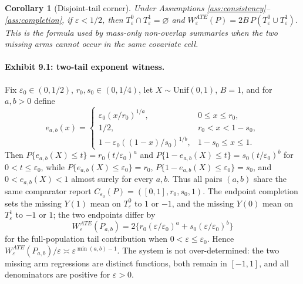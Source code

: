 \documentclass[11pt]{article}
\theoremstyle{definition}
\theoremstyle{plain}
\newtheorem{corollary}{Corollary}
\theoremstyle{remark}
\begin{document}
\begin{corollary}[Disjoint-tail corner]\label{cor:disjoint-tail}
Under Assumptions \ref{ass:consistency}--\ref{ass:completion}, if
\(\varepsilon<1/2\), then \(T_\varepsilon^0\cap T_\varepsilon^1=\varnothing\) and
\(W_\varepsilon^{ATE}(P)=2B\,P(T_\varepsilon^0\cup T_\varepsilon^1)\). This is the
formula used by mass-only non-overlap summaries when the two missing arms cannot occur
in the same covariate cell.
\end{corollary}

\paragraph{Exhibit 9.1: two-tail exponent witness.}
Fix \(\varepsilon_0\in(0,1/2)\), \(r_0,s_0\in(0,1/4)\), let
\(X\sim \mathrm{Unif}(0,1)\), \(B=1\), and for \(a,b>0\) define
\[
e_{a,b}(x)=
\begin{cases}
\varepsilon_0(x/r_0)^{1/a}, & 0\leq x\leq r_0,\\
1/2, & r_0<x<1-s_0,\\
1-\varepsilon_0((1-x)/s_0)^{1/b}, & 1-s_0\leq x\leq 1.
\end{cases}
\]
Then \(P\{e_{a,b}(X)\leq t\}=r_0(t/\varepsilon_0)^a\) and
\(P\{1-e_{a,b}(X)\leq t\}=s_0(t/\varepsilon_0)^b\) for
\(0<t\leq\varepsilon_0\), while \(P\{e_{a,b}(X)\leq\varepsilon_0\}=r_0\),
\(P\{1-e_{a,b}(X)\leq\varepsilon_0\}=s_0\), and \(0<e_{a,b}(X)<1\) almost surely for
every \(a,b\). Thus all pairs \((a,b)\) share the same comparator report
\(C_{\varepsilon_0}(P)=( [0,1],r_0,s_0,1)\). The endpoint completion sets the
missing \(Y(1)\) mean on \(T_\varepsilon^0\) to \(1\) or \(-1\), and the missing \(Y(0)\)
mean on \(T_\varepsilon^1\) to \(-1\) or \(1\); the two endpoints differ by
\[
W_\varepsilon^{ATE}(P_{a,b})
=2\{r_0(\varepsilon/\varepsilon_0)^a+s_0(\varepsilon/\varepsilon_0)^b\}
\]
for the full-population tail contribution when \(0<\varepsilon\leq\varepsilon_0\). Hence
\(W_\varepsilon^{ATE}(P_{a,b})/\varepsilon
\asymp \varepsilon^{\min(a,b)-1}\). The system is not over-determined: the two missing
arm regressions are distinct functions, both remain in \([-1,1]\), and all denominators
are positive for \(\varepsilon>0\).
\end{document}
